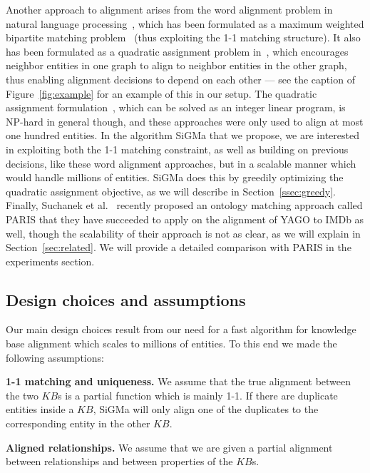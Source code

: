 \documentclass{sig-alternate}
\newcommand{\ts}[1]{\textsf{#1}}
\newcommand{\KB}{K\!B}
\begin{document}
Another approach to alignment arises from the word alignment problem in natural language processing~\cite{och03comparison}, which has been formulated as a maximum weighted bipartite matching problem~\cite{taskar05matching} (thus exploiting the 1-1 matching structure). It also has been formulated as a quadratic assignment problem in~\cite{lacoste06qap}, which encourages neighbor entities in one graph to align to neighbor entities in the other graph, thus enabling alignment decisions to depend on each other --- see the caption of Figure~\ref{fig:example} for an example of this in our setup. The quadratic assignment formulation~\cite{lawler63qap}, which can be solved as an integer linear program, is NP-hard in general though, and these approaches were only used to align at most one hundred entities. In the algorithm \ts{SiGMa} that we propose, we are interested in exploiting both the 1-1 matching constraint, as well as building on previous decisions, like these word alignment approaches, but in a scalable manner which would handle millions of entities. \ts{SiGMa} does this by greedily optimizing the quadratic assignment objective, as we will describe in Section~\ref{ssec:greedy}. Finally, Suchanek et al.~\cite{suchanek12PARIS} recently proposed an ontology matching approach called \ts{PARIS} that they have succeeded to apply on the alignment of \ts{YAGO} to \ts{IMDb} as well, though the scalability of their approach is not as clear, as we will explain in Section~\ref{sec:related}. We will provide a detailed comparison with \ts{PARIS} in the experiments section.

\subsection{Design choices and assumptions}
Our main design choices result from our need for a fast algorithm for knowledge base alignment which scales to millions of entities. %
To this end we made the following assumptions:

\textbf{1-1 matching and uniqueness.} We assume that the true alignment between the two $\KB$s is a partial function which is mainly 1-1. %
If there are duplicate entities inside a $\KB$, \textsf{SiGMa} will only align one of the duplicates to the corresponding entity in the other $\KB$.

\textbf{Aligned relationships.} We assume that we are given a partial alignment between relationships and between properties of the $\KB$s.

%
%
%
%
\end{document}
